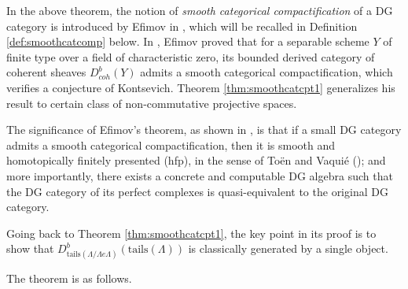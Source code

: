 \documentclass[11pt,reqno]{amsart}
\theoremstyle{definition}
\begin{document}
In the above theorem, the notion of {\it smooth categorical compactification}
of a DG category is introduced by Efimov in \cite{Efi1}, which will be recalled in
Definition \ref{def:smoothcatcomp} below. 
In \cite{Efi1}, Efimov proved that for a separable scheme $Y$ 
of finite type over a field
of characteristic zero,
its bounded derived category of coherent sheaves 
$D^b_{coh}(Y)$
admits a smooth categorical compactification, 
which verifies a conjecture of 
Kontsevich.
Theorem \ref{thm:smoothcatcpt1} generalizes his result to 
certain class of non-commutative projective spaces. 

The significance of Efimov's theorem, as shown in \cite{Efi1},
is that if a small DG category
admits a smooth categorical compactification, then it 
is smooth and homotopically 
finitely presented (hfp),
in the sense of To\"en and Vaqui\'e
(\cite{TV}); and more importantly,
there exists a concrete and computable DG algebra
such that the DG category of its perfect complexes is quasi-equivalent 
to the original DG category. 

Going back to Theorem \ref{thm:smoothcatcpt1},
the key point in its proof is to show that
$D^{b}_{\mathrm{tails}(\Lambda/\Lambda e 
\Lambda)}(\mathrm{tails}(\Lambda))$ 
is classically generated by a single object. 

The theorem is as follows.
\end{document}
